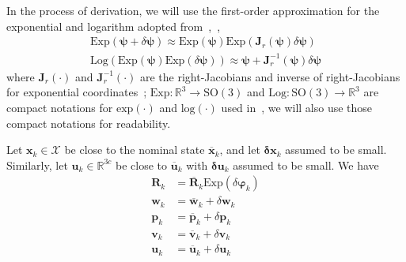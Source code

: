 In the process of derivation, we will use the first-order approximation for the exponential and logarithm adopted from~\cite{forster2016manifold},~\cite{barfoot2014associating},
\begin{align}
\label{eq:exp_apprx}
\mathrm{Exp}(\boldsymbol{\psi}+\delta{\boldsymbol{\psi}}) \approx \mathrm{Exp}(\boldsymbol{\psi})\mathrm{Exp}(\mathbf{J}_{r}(\boldsymbol{\psi})\delta{\boldsymbol{\psi}}) \\
\label{eq:log_apprx}
\mathrm{Log} \left( \mathrm{Exp}(\boldsymbol{\psi}) \mathrm{Exp}(\delta \boldsymbol{\psi}) \right) \approx \boldsymbol{\psi} + \mathbf{J}_{r}^{-1}(\boldsymbol{\psi})\delta{\boldsymbol{\psi}}
\end{align}
where $\mathbf{J}_{r}(\cdot)$ and $\mathbf{J}_{r}^{-1}(\cdot)$ are the right-Jacobians and inverse of right-Jacobians for exponential coordinates~\cite{chirikjian2011stochastic}; $\mathrm{Exp}:\mathbb{R}^3 \rightarrow \mathrm{SO}(3)$ and $\mathrm{Log}:\mathrm{SO}(3) \rightarrow \mathbb{R}^3$ are compact notations for $\mathrm{exp}(\cdot)$ and $\mathrm{log}(\cdot)$ used in~\cite{forster2016manifold}, we will also use those compact notations for readability.

Let $\mathbf{x}_{k} \in \mathcal{X}$ be close to the nominal state $\overline{\mathbf{x}}_{k}$, and let $\mathbf{\delta x}_{k}$ assumed to be small. Similarly, let $\mathbf{u}_{k} \in \mathbb{R}^{3c}$ be close to $\overline{\mathbf{u}}_{k}$ with $\mathbf{\delta u}_{k}$ assumed to be small. We have
\begin{subequations} \label{eq:retraction}
	\begin{align}
	\label{eq:retraction_R}
	\mathbf{R}_{k} &= \overline{\mathbf{R}}_{k} \mathrm{Exp}(\delta{\boldsymbol{\varphi}_{k}})\\
	\label{eq:retraction_w}
	\mathbf{w}_{k} &= {\overline{\mathbf{w}}_{k}} + {\delta{\mathbf{w}_{k}}} \\
	\label{eq:retraction_p}
	\mathbf{p}_{k} &= {\overline{\mathbf{p}}_{k}} + {\delta{\mathbf{p}_{k}}} \\
	\label{eq:retraction_v}
	\mathbf{v}_{k} &= {\overline{\mathbf{v}}_{k}} + {\delta{\mathbf{v}_{k}}} \\
	\label{eq:retraction_u}
	\mathbf{u}_{k} &= {\overline{\mathbf{u}}_{k}} + {\delta{\mathbf{u}_{k}}}
	\end{align}
\end{subequations}


